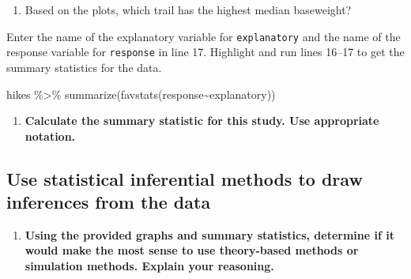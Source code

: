 \documentclass[
]{report}
\newenvironment{Shaded}{\begin{snugshade}}{\end{snugshade}}
\newcommand{\FunctionTok}[1]{\textcolor[rgb]{0.00,0.00,0.00}{#1}}
\newcommand{\NormalTok}[1]{#1}
\newcommand{\SpecialCharTok}[1]{\textcolor[rgb]{0.00,0.00,0.00}{#1}}
\providecommand{\tightlist}{%
  \setlength{\itemsep}{0pt}\setlength{\parskip}{0pt}}
\begin{document}
\begin{enumerate}
\def\labelenumi{\arabic{enumi}.}
\setcounter{enumi}{5}
\tightlist
\item
  Based on the plots, which trail has the highest median baseweight?
  \vspace{0.2in}
\end{enumerate}

Enter the name of the explanatory variable for \texttt{explanatory} and the name of the response variable for \texttt{response} in line 17. Highlight and run lines 16--17 to get the summary statistics for the data.

\begin{Shaded}
\begin{Highlighting}[]
\NormalTok{hikes }\SpecialCharTok{\%\textgreater{}\%}
  \FunctionTok{summarize}\NormalTok{(}\FunctionTok{favstats}\NormalTok{(response}\SpecialCharTok{\textasciitilde{}}\NormalTok{explanatory))}
\end{Highlighting}
\end{Shaded}

\begin{enumerate}
\def\labelenumi{\arabic{enumi}.}
\setcounter{enumi}{6}
\tightlist
\item
  \textbf{Calculate the summary statistic for this study. Use appropriate notation.}
\end{enumerate}

\vspace{1in}

\hypertarget{use-statistical-inferential-methods-to-draw-inferences-from-the-data-5}{%
\subsection*{Use statistical inferential methods to draw inferences from the data}\label{use-statistical-inferential-methods-to-draw-inferences-from-the-data-5}}

\begin{enumerate}
\def\labelenumi{\arabic{enumi}.}
\setcounter{enumi}{7}
\tightlist
\item
  \textbf{Using the provided graphs and summary statistics, determine if it would make the most sense to use theory-based methods or simulation methods. Explain your reasoning.}
\end{enumerate}

\vspace{0.8in}
\end{document}
